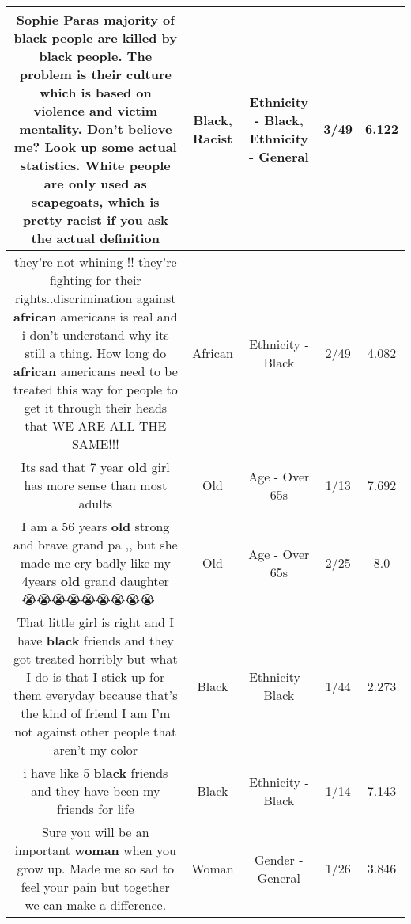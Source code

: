 \documentclass[11pt]{article}
\newlength\mylength
\begin{document}
\begin{center}
\begin{longtable}{|C{.65\mylength}|C{.30\mylength}|C{.12\mylength}|C{.12\mylength}|C{.12\mylength}|}
  \small Sophie Paras majority of \textbf{black} people are killed by \textbf{black} people. The problem is their culture which is based on violence and victim mentality. Don't believe me? Look up some actual statistics. White people are only used as scapegoats, which is pretty \textbf{racist} if you ask the actual definition\normalsize   & Black, Racist & Ethnicity - Black, Ethnicity - General & 3/49 & 6.122 \\  \hline
  \small they're not whining !! they're fighting for their rights..discrimination against \textbf{african} americans is real and i don't understand why its still a thing. How long do \textbf{african} americans need to be treated this way for people to get it through their heads that WE ARE ALL THE SAME!!!\normalsize   & African & Ethnicity - Black & 2/49 & 4.082 \\  \hline
  \small Its sad that 7 year \textbf{old} girl has more sense than most adults\normalsize   & Old & Age - Over 65s & 1/13 & 7.692 \\  \hline
  \small I am a 56 years \textbf{old} strong and brave  grand pa ,, but she made me cry badly like my 4years \textbf{old} grand daughter 😭😭😭😭😭😭😭😭😭💞💞💞💞\normalsize   & Old & Age - Over 65s & 2/25 & 8.0 \\  \hline
  \small That little girl is right and I have \textbf{black} friends and they got treated horribly but what I do is that I stick up for them everyday because that's the kind of friend I am I'm not against other people that aren't my color\normalsize   & Black & Ethnicity - Black & 1/44 & 2.273 \\  \hline
  \small i have like 5 \textbf{black} friends and they have been my friends for life\normalsize   & Black & Ethnicity - Black & 1/14 & 7.143 \\  \hline
  \small Sure you will be an important \textbf{woman} when you grow up. Made me so sad to feel your pain but together we can make a difference.\normalsize   & Woman & Gender - General & 1/26 & 3.846 \\  \hline

\end{longtable}
\end{center}
\end{document}
